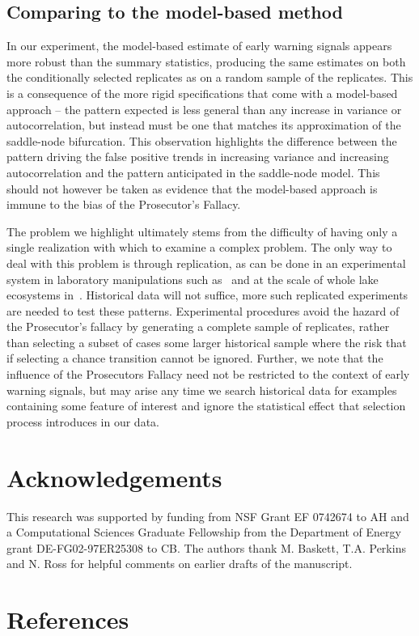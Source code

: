 \documentclass[authoryear,review,12pt]{elsarticle}
\begin{document}
\subsection{Comparing to the model-based method}

In our experiment, the model-based estimate of early warning signals
appears more robust than the summary statistics, producing the same
estimates on both the conditionally selected replicates as on a random
sample of the replicates.  This is a consequence of the more rigid
specifications that come with a model-based approach -- the pattern
expected is less general than any increase in variance or autocorrelation,
but instead must be one that matches its approximation of the saddle-node
bifurcation. This observation highlights the difference between the
pattern driving the false positive trends in increasing variance and
increasing autocorrelation and the pattern anticipated in the saddle-node
model. This should not however be taken as evidence that the model-based
approach is immune to the bias of the Prosecutor's Fallacy.


The problem we highlight ultimately stems from the difficulty of having
only a single realization with which to examine a complex problem.
The only way to deal with this problem is through replication, as
can be done in an experimental system in laboratory manipulations
such as~\citet{Drake2010, Veraart2011} and at the scale of whole lake
ecosystems in~\citet{Carpenter2011}.  Historical data will not suffice,
more such replicated experiments are needed to test these patterns.
Experimental procedures avoid the hazard of the Prosecutor's fallacy by
generating a complete sample of replicates, rather than selecting a subset
of cases some larger historical sample where the risk that if selecting a
chance transition cannot be ignored.  Further, we note that the influence
of the Prosecutors Fallacy need not be restricted to the context of early
warning signals, but may arise any time we search historical data for
examples containing some feature of interest and ignore the statistical
effect that selection process introduces in our data.





 \section{Acknowledgements}
This research was supported by funding from NSF Grant EF 0742674 to AH
and a Computational Sciences Graduate Fellowship from the Department of
Energy grant DE-FG02-97ER25308 to CB. The authors thank M. Baskett, 
T.A. Perkins and N. Ross for helpful comments on earlier drafts of the
manuscript.  

 \section{References}%
 
 
\end{document}

